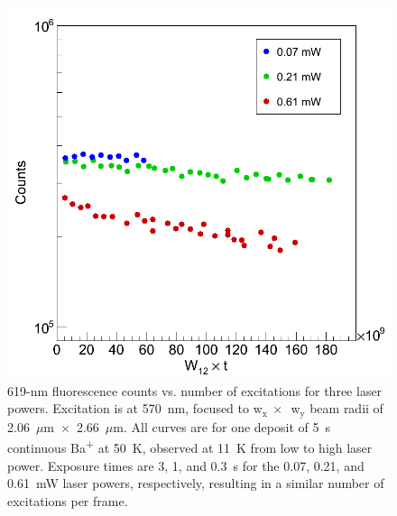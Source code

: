 
\begin{figure} %
        \centering
                \includegraphics[width=.5\textwidth]{figures/619_bleach_w12t_semilog.png}
                \caption{619-nm fluorescence counts vs. number of excitations for three laser powers.  Excitation is at 570~nm, focused to w$_{\text{x}}~\times$~w$_{\text{y}}$ beam radii of 2.06~$\mu$m~$\times$~2.66~$\mu$m. All curves are for one deposit of 5~s continuous Ba\textsuperscript{+} at 50~K, observed at 11~K from low to high laser power. Exposure times are 3, 1, and 0.3~s for the 0.07, 0.21, and 0.61~mW laser powers, respectively, resulting in a similar number of excitations per frame.}
\label{fig:bleaching619}
\end{figure}



